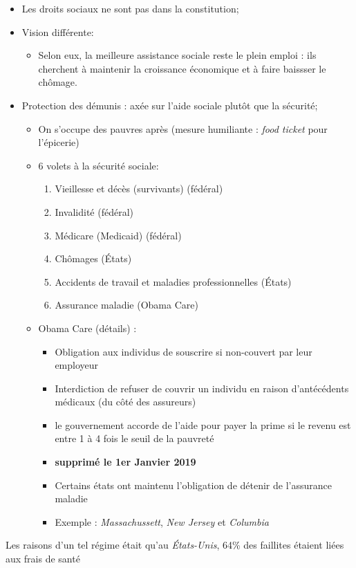 \documentclass[10pt, french]{article}
\begin{document}
\begin{multicols*}{3}
\begin{itemize}[leftmargin = *]
	\item	Les droits sociaux ne sont pas dans la constitution;
	\item Vision différente:
	  \begin{itemize}
	  \item Selon eux, la meilleure assistance sociale reste le plein emploi : ils cherchent à maintenir la croissance économique et à faire baissser le chômage.
	  \end{itemize}
	\item Protection des démunis : axée sur l'aide sociale plutôt que la sécurité;
	  \begin{itemize}
	  \item On s'occupe des pauvres après (mesure humiliante : \textit{food ticket} pour l'épicerie)
	  \item 6 volets à la sécurité sociale:
	  \begin{enumerate}
	    \item Vieillesse et décès (survivants) (\textcolor{bulgarianrose}{fédéral})
	    \item Invalidité (\textcolor{bulgarianrose}{fédéral})
	    \item Médicare (Medicaid) (\textcolor{bulgarianrose}{fédéral})
	    \item Chômages (États)
	    \item Accidents de travail et maladies professionnelles (États)
	    \item Assurance maladie (Obama Care)
	  \end{enumerate}
	\item Obama Care (détails) : 
	  \begin{itemize}
	    \item Obligation aux individus de souscrire si non-couvert par leur employeur
	    \item Interdiction de refuser de couvrir un individu en raison d'antécédents médicaux (du côté des assureurs)
	    \item le gouvernement accorde de l'aide pour payer la prime si le revenu est entre 1 à 4 fois le seuil de la pauvreté
	    \item \textbf{supprimé le 1er Janvier 2019 }
	    \item Certains états ont maintenu l'obligation de détenir de l'assurance maladie
	    \item[] Exemple : \textit{Massachussett}, \textit{New Jersey} et \textit{Columbia}
	 \end{itemize}
	 \end{itemize}
	 \end{itemize}
 Les raisons d'un tel régime était qu'au \textit{États-Unis}, 64\% des faillites étaient liées aux frais de santé
\newpage


\end{multicols*}
\end{document}
